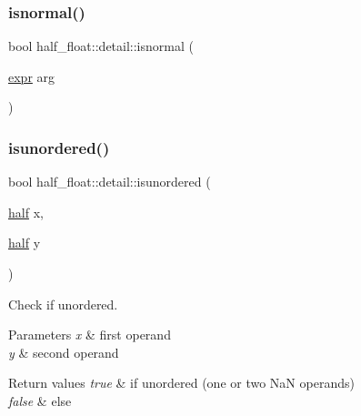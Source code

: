 \subsubsection{\texorpdfstring{isnormal()}{isnormal()}\hspace{0.1cm}{\footnotesize\ttfamily [2/2]}}
{\footnotesize\ttfamily bool half\+\_\+float\+::detail\+::isnormal (\begin{DoxyParamCaption}\item[{\hyperlink{structhalf__float_1_1detail_1_1expr}{expr}}]{arg }\end{DoxyParamCaption})\hspace{0.3cm}{\ttfamily [inline]}}

\mbox{\label{namespacehalf__float_1_1detail_a9d7bd7653ebeced3088e8ab759456728}} 
\subsubsection{\texorpdfstring{isunordered()}{isunordered()}\hspace{0.1cm}{\footnotesize\ttfamily [1/4]}}
{\footnotesize\ttfamily bool half\+\_\+float\+::detail\+::isunordered (\begin{DoxyParamCaption}\item[{\hyperlink{classhalf__float_1_1half}{half}}]{x,  }\item[{\hyperlink{classhalf__float_1_1half}{half}}]{y }\end{DoxyParamCaption})\hspace{0.3cm}{\ttfamily [inline]}}

Check if unordered. 
\begin{DoxyParams}{Parameters}
{\em x} & first operand \\
\hline
{\em y} & second operand \\
\hline
\end{DoxyParams}

\begin{DoxyRetVals}{Return values}
{\em true} & if unordered (one or two NaN operands) \\
\hline
{\em false} & else \\
\hline
\end{DoxyRetVals}
\mbox{\label{namespacehalf__float_1_1detail_af94f1ec641bbd4dcf8528eeb01a2ac20}} 
